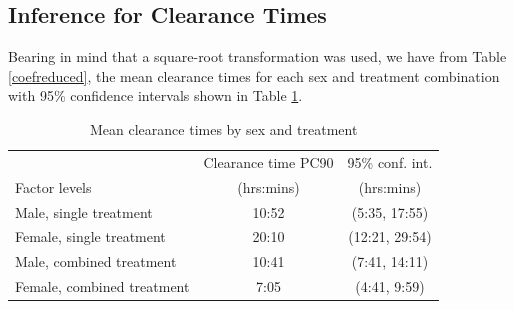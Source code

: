 \subsection{Inference for Clearance Times}

Bearing in mind that a square-root transformation was used, we have from Table \ref{coefreduced}, the mean clearance times for each sex and treatment combination with 95\% confidence intervals shown in Table \ref{inference}.
\begin{table}[h]
\centering
\caption{Mean clearance times by sex and treatment}\label{inference}
\begin{tabular}{|l|c|c|}
\hline
&Clearance time PC90&95\% conf. int.\\
Factor levels&(hrs:mins)&(hrs:mins)\\
\hline
Male, single treatment 		& 10:52 & (5:35, 17:55) \\
Female, single treatment		& 20:10 & (12:21,  29:54) \\
Male, combined treatment	& 10:41 & (7:41, 14:11) \\
Female, combined treatment	& 7:05 & (4:41, 9:59) \\
\hline
\end{tabular}
\end{table}

